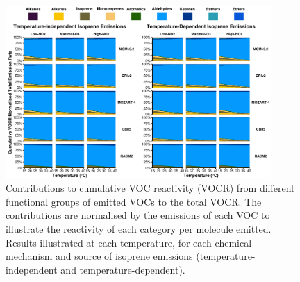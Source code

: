 \documentclass[11pt,a4paper]{article}
\begin{document}
\begin{figure}[ht]
    \centering
    \caption{Contributions to cumulative VOC reactivity (VOCR) from different functional groups of emitted VOCs to the total VOCR. The contributions are normalised by the emissions of each VOC to illustrate the reactivity of each category per molecule emitted. Results illustrated at each temperature, for each chemical mechanism and source of isoprene emissions (temperature-independent and temperature-dependent).}
    \includegraphics[width = 0.9\textwidth]{img/Sum_VOCR_percent_normalised}
\end{figure}

\newpage
\end{document}

